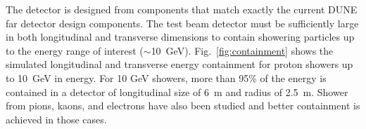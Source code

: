

The detector is designed from components that match exactly the current DUNE far detector design components. 
The test beam detector must be sufficiently large in both
longitudinal and transverse dimensions to contain showering particles up to the energy range of interest ($\sim$10~GeV).
Fig.~\ref{fig:containment} shows the simulated longitudinal and transverse 
energy containment for proton showers up to 10~GeV in energy.
For 10 GeV showers, more than 95\% of the energy is contained in a detector of longitudinal size of 6~m and 
radius of 2.5~m. Shower from pions, kaons, and electrons have also been studied and better containment
is achieved in those cases. 
